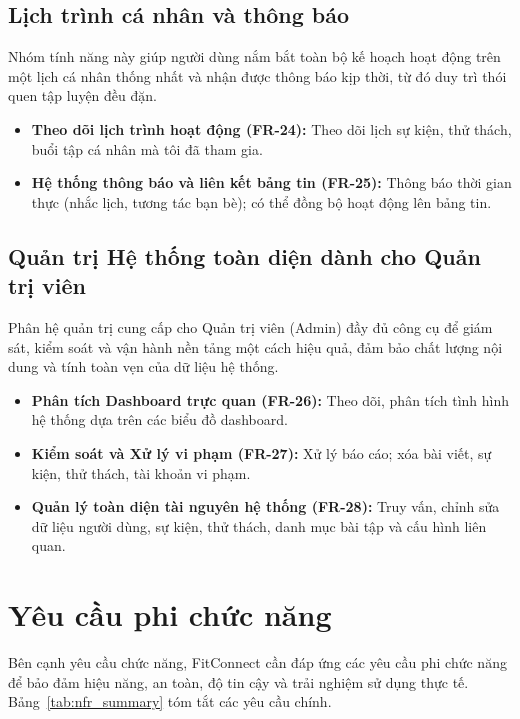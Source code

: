 \subsection{Lịch trình cá nhân và thông báo}
Nhóm tính năng này giúp người dùng nắm bắt toàn bộ kế hoạch hoạt động trên một lịch cá nhân thống nhất và nhận được thông báo kịp thời, từ đó duy trì thói quen tập luyện đều đặn.
\begin{itemize}
    \item \textbf{Theo dõi lịch trình hoạt động (FR-24):} Theo dõi lịch sự kiện, thử thách, buổi tập cá nhân mà tôi đã tham gia.
    \item \textbf{Hệ thống thông báo và liên kết bảng tin (FR-25):} Thông báo thời gian thực (nhắc lịch, tương tác bạn bè); có thể đồng bộ hoạt động lên bảng tin.
\end{itemize}

\subsection{Quản trị Hệ thống toàn diện dành cho Quản trị viên}
Phân hệ quản trị cung cấp cho Quản trị viên (Admin) đầy đủ công cụ để giám sát, kiểm soát và vận hành nền tảng một cách hiệu quả, đảm bảo chất lượng nội dung và tính toàn vẹn của dữ liệu hệ thống.
\begin{itemize}
    \item \textbf{Phân tích Dashboard trực quan (FR-26):} Theo dõi, phân tích tình hình hệ thống dựa trên các biểu đồ dashboard.
    \item \textbf{Kiểm soát và Xử lý vi phạm (FR-27):} Xử lý báo cáo; xóa bài viết, sự kiện, thử thách, tài khoản vi phạm.
    \item \textbf{Quản lý toàn diện tài nguyên hệ thống (FR-28):} Truy vấn, chỉnh sửa dữ liệu người dùng, sự kiện, thử thách, danh mục bài tập và cấu hình liên quan.
\end{itemize}

\section{Yêu cầu phi chức năng}
\label{sec:req:nfr_manual}

Bên cạnh yêu cầu chức năng, FitConnect cần đáp ứng các yêu cầu phi chức năng để bảo đảm hiệu năng, an toàn, độ tin cậy và trải nghiệm sử dụng thực tế. Bảng~\ref{tab:nfr_summary} tóm tắt các yêu cầu chính.

